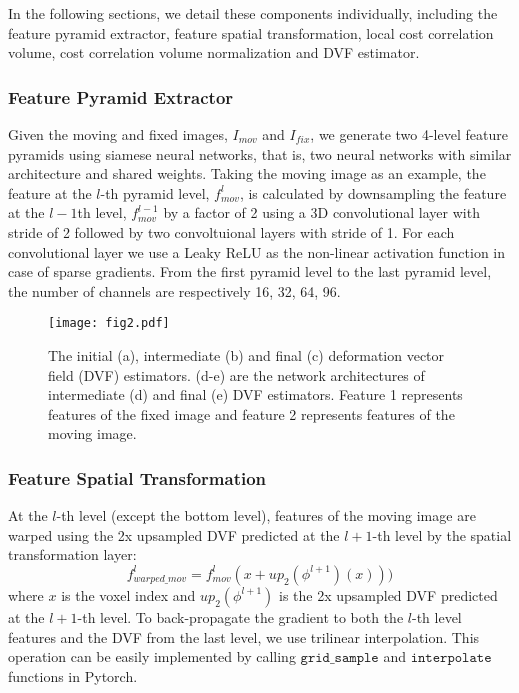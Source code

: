 \documentclass[runningheads]{llncs}
\begin{document}
In the following sections, we detail these components individually, including the feature pyramid extractor, feature spatial transformation, local cost correlation volume, cost correlation volume normalization and DVF estimator. 

\subsubsection{Feature Pyramid Extractor}
Given the moving  and  fixed images, $I_{mov}$ and $I_{fix}$, we generate two 4-level feature pyramids using siamese neural networks, that is, two neural networks with similar architecture and shared weights. Taking the moving image as an example, the feature at the $l$-th pyramid level, $f^{l}_{mov}$, is calculated by downsampling the feature at the $l-1$th level, $f^{l-1}_{mov}$ by a factor of 2 using a 3D convolutional layer with stride of 2 followed by two convoltuional layers with stride of 1. For each convolutional layer we use a Leaky ReLU as the non-linear activation function in case of sparse gradients. From the first pyramid level to the last pyramid level, the number of channels are respectively 16, 32, 64, 96.

\begin{figure}[t]
\texttt{[image: fig2.pdf]}
\caption{The initial (a), intermediate (b) and final (c) deformation vector field (DVF) estimators. (d-e) are the network architectures of intermediate (d) and final (e) DVF estimators. Feature 1 represents features of the fixed image and feature 2 represents features of the moving image.} \label{fig2}
\end{figure}

\subsubsection{Feature Spatial Transformation}
At the $l$-th level (except the bottom level), features of the moving image are warped using the 2x upsampled DVF predicted at the $l+1$-th level by the spatial transformation layer\cite{jaderbergSpatialTransformerNetworks2016}:
\begin{equation}
f^{l}_{warped\_mov}=f^{l}_{mov}(x+up_2(\phi^{l+1})(x)))
\end{equation}
where $x$ is the voxel index and $up_2(\phi^{l+1})$ is the 2x upsampled DVF predicted at the $l+1$-th level. To back-propagate the gradient to both the $l$-th level features and the DVF from the last level, we use trilinear interpolation. This operation can be easily implemented by calling $\texttt{grid\_sample}$ and $\texttt{interpolate}$ functions in Pytorch.
\end{document}

